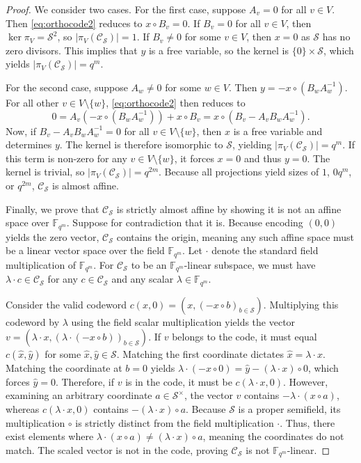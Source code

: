 \documentclass[a4paper,11pt,reqno]{article}
\theoremstyle{plain} \numberwithin{equation}{section}
\theoremstyle{definition}
\begin{document}
\begin{proof}
We consider two cases. For the first case, suppose $A_v =0$ for all $v\in V$. Then \eqref{eq:orthocode2} reduces to $x\circ B_v =0$. If $B_v = 0$ for all $v\in V$, then $\ker \pi_V = \mathcal{S}^2$, so $|\pi_V(\mathcal{C}_{\mathcal{S}})| = 1$. If $B_v \neq 0$ for some $v\in V$, then $x=0$ as $\mathcal{S}$ has no zero divisors. This implies that $y$ is a free variable, so the kernel is $\{0\} \times \mathcal{S}$, which yields $|\pi_V(\mathcal{C}_{\mathcal{S}})|= q^m$.

For the second case, suppose $A_w \neq 0$ for some $w\in V$. Then $y= -x\circ (B_w A_w^{-1})$. For all other $v\in V\setminus \{w\}$, \eqref{eq:orthocode2} then reduces to
\[
    0 = A_v(-x\circ (B_wA_w^{-1}))+ x\circ B_v = x\circ (B_v - A_v B_w A_w^{-1}).
\]
Now, if $B_v - A_v B_w A_w^{-1}=0$ for all $v\in V\setminus \{w\}$, then $x$ is a free variable and determines $y$. The kernel is therefore isomorphic to $\mathcal{S}$, yielding $|\pi_V(\mathcal{C}_{\mathcal{S}})|= q^m$. If this term is non-zero for any $v\in V\setminus \{w\}$, it forces $x=0$ and thus $y=0$. The kernel is trivial, so $|\pi_V(\mathcal{C}_{\mathcal{S}})| = q^{2m}$. Because all projections yield sizes of $1$, $0q^m$, or $q^{2m}$, $\mathcal{C}_{\mathcal{S}}$ is almost affine.


Finally, we prove that $\mathcal{C}_{\mathcal{S}}$ is strictly almost affine by showing it is not an affine space over $\mathbb{F}_{q^m}$. Suppose for contradiction that it is. Because encoding $(0,0)$ yields the zero vector, $\mathcal{C}_{\mathcal{S}}$ contains the origin, meaning any such affine space must be a linear vector space over the field $\mathbb{F}_{q^m}$. Let $\cdot$ denote the standard field multiplication of $\mathbb{F}_{q^m}$. For $\mathcal{C}_{\mathcal{S}}$ to be an $\mathbb{F}_{q^m}$-linear subspace, we must have $\lambda \cdot c \in \mathcal{C}_{\mathcal{S}}$ for any $c \in \mathcal{C}_{\mathcal{S}}$ and any scalar $\lambda \in \mathbb{F}_{q^m}$.

Consider the valid codeword $c(x,0) = (x, (-x \circ b)_{b \in \mathcal{S}})$. Multiplying this codeword by $\lambda$ using the field scalar multiplication yields the vector $v = (\lambda \cdot x, (\lambda \cdot (-x \circ b))_{b \in \mathcal{S}})$. If $v$ belongs to the code, it must equal $c(\hat{x}, \hat{y})$ for some $\hat{x}, \hat{y} \in \mathcal{S}$. Matching the first coordinate dictates $\hat{x} = \lambda \cdot x$. Matching the coordinate at $b=0$ yields $\lambda \cdot (-x \circ 0) = \hat{y} - (\lambda \cdot x) \circ 0$, which forces $\hat{y} = 0$. Therefore, if $v$ is in the code, it must be $c(\lambda \cdot x, 0)$. However, examining an arbitrary coordinate $a \in \mathcal{S}^{\times}$, the vector $v$ contains $-\lambda \cdot (x \circ a)$, whereas $c(\lambda \cdot x, 0)$ contains $-(\lambda \cdot x) \circ a$. Because $\mathcal{S}$ is a proper semifield, its multiplication $\circ$ is strictly distinct from the field multiplication $\cdot$. Thus, there exist elements where $\lambda \cdot (x \circ a) \neq (\lambda \cdot x) \circ a$, meaning the coordinates do not match. The scaled vector is not in the code, proving $\mathcal{C}_{\mathcal{S}}$ is not $\mathbb{F}_{q^m}$-linear.
\end{proof}
\end{document}
